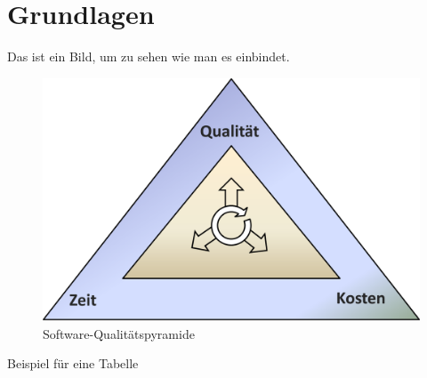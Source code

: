 \section{Grundlagen}
\label{sec:fundamentals}

Das ist ein Bild, um zu sehen wie man es einbindet.
\begin{figure}[H]
\centering
\includegraphics[width=1.1\textwidth]{../images/software_quality_triangle.PNG}
\caption[Software-Qualitätspyramide]{Software-Qualitätspyramide}
\label{fig:software_quality_triangle}
\end{figure}

Beispiel für eine Tabelle

